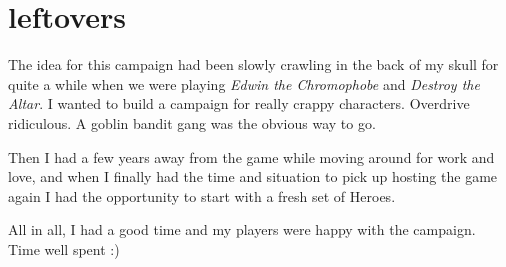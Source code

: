 \section*{leftovers}

\raggedbottom

The idea for this campaign had been slowly crawling in the back of my skull for quite a while when we were playing \emph{Edwin the Chromophobe} and \emph{Destroy the Altar}. I wanted to build a campaign for really crappy characters. Overdrive ridiculous. A goblin bandit gang was the obvious way to go.

Then I had a few years away from the game while moving around for work and love, and when I finally had the time and situation to pick up hosting the game again I had the opportunity to start with a fresh set of Heroes.

All in all, I had a good time and my players were happy with the campaign. Time well spent :)





